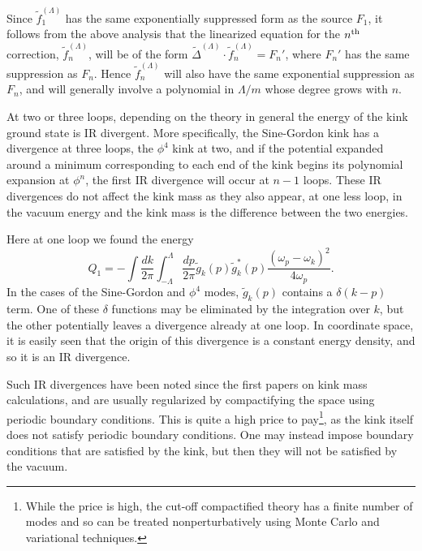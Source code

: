 \def\letter{0}\def\pr{0}\documentclass[a4paper,12pt, epsfig]{article}
\makeatletter
\renewcommand{\(}{\begin{equation}}
\renewcommand{\)}{end{equation} \vspace{-.05in}\linebreak}
\renewcommand{\=}{\hspace{-.03in}=\hspace{-.02in}}
\renewcommand{\(}{\begin{equation}}
\renewcommand{\)}{\end{equation}}
\renewcommand{\(}{\begin{equation}}
\renewcommand{\)}{\end{equation}}
\def\lpin#1{\int^\Lambda_{-\Lambda} \frac{d#1}{2\pi}}
\def\pin#1{\int \frac{d#1}{2\pi}}
\newcommand{\beq}{\begin{equation}}
\newcommand{\eeq}{\end{equation}}
\def\section{\@startsection{section}{1}{\z@}{3.5ex plus 1ex minus  .2ex}{2.3ex plus .2ex}{\large\bf}}
\makeatother
\begin{document}
Since $\tilde{f}_{1}^{(\Lambda)}$ has the same exponentially suppressed form as the source $F_1$, it follows from the above analysis that the linearized equation for the $n^{\rm th}$ correction, $\tilde{f}_{n}^{(\Lambda)}$, will be of the form $\tilde{\Delta}^{(\Lambda)} \cdot \tilde{f}_{n}^{(\Lambda)} = F_{n}'$, where $F_{n}'$ has the same suppression as $F_n$.  Hence $\tilde{f}_{n}^{(\Lambda)}$ will also have the same exponential suppression as $F_n$, and will generally involve a polynomial in $\Lambda/m$ whose degree grows with $n$.















\section{IR Divergences} \label{irapp}

At two or three loops, depending on the theory in general the energy of the kink ground state is IR divergent.  More specifically, the Sine-Gordon kink has a divergence at three loops, the $\phi^4$ kink at two, and if the potential expanded around a minimum corresponding to each end of the kink begins its polynomial expansion at $\phi^n$, the first IR divergence will occur at $n-1$ loops.  These IR divergences do not affect the kink mass as they also appear, at one less loop, in the vacuum energy and the kink mass is the difference between the two energies.

Here at one loop we found the energy
\beq
Q_1=-\pin{k}\lpin{p} \tilde{g}_k(p)\tilde{g}^*_k(p) \frac{\left(\omega_{p}-\omega_k\right)^2}{4\omega_p}.
\eeq
In the cases of the Sine-Gordon and $\phi^4$ modes, $\tilde{g}_k(p)$ contains a $\delta(k-p)$ term.  One of these $\delta$ functions may be eliminated by the integration over $k$, but the other potentially leaves a divergence already at one loop.  In coordinate space, it is easily seen that the origin of this divergence is a constant energy density, and so it is an IR divergence.  

Such IR divergences have been noted since the first papers \cite{dhn2} on kink mass calculations, and are usually regularized by compactifying the space using periodic boundary conditions.  This is quite a high price to pay\footnote{While the price is high, the cut-off compactified theory has a finite number of modes and so can be treated nonperturbatively using Monte Carlo \cite{lee,slava,bajnok} and variational \cite{tensor20} techniques.}, as the kink itself does not satisfy periodic boundary conditions.  One may instead impose boundary conditions that are satisfied by the kink, but then they will not be satisfied by the vacuum.  
\end{document}
